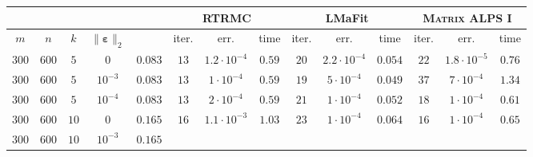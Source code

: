 \documentclass[twocolumn]{svjour3}
\newcommand{\vectornormbig}[1]{\big\|#1\big\|}
\newcommand{\noise}{\boldsymbol{\varepsilon}}
\newcommand{\rank}{k}
\begin{document}
\begin{table*}[!htp]
\begin{center}
\begin{tabular}{|c|c|c|c|c|c|c|c|c|c|c|c|c|c|}
\hline \hline \hline
\multicolumn{4}{c|}{} & & \multicolumn{3}{|c|}{RTRMC} & \multicolumn{3}{|c|}{LMaFit} & \multicolumn{3}{|c}{\textsc{Matrix ALPS I}} \\
\hline \hline
\multicolumn{1}{c}{$m$} & \multicolumn{1}{c}{$n$} & \multicolumn{1}{c}{$\rank$} & \multicolumn{1}{c|}{$\vectornormbig{\noise}_2$} & & 
\multicolumn{1}{|c}{\rm{iter.}} & \multicolumn{1}{c}{\rm{err.}} & \multicolumn{1}{c|}{\rm{time}} &
\multicolumn{1}{|c}{\rm{iter.}} & \multicolumn{1}{c}{\rm{err.}} & \multicolumn{1}{c|}{\rm{time}} &
\multicolumn{1}{|c}{\rm{iter.}} & \multicolumn{1}{c}{\rm{err.}} & \multicolumn{1}{c}{\rm{time}} \\
\hline\hline
\multicolumn{1}{c}{$300$} & \multicolumn{1}{c}{$600$} & \multicolumn{1}{c}{$5$} & \multicolumn{1}{c|}{$0$} & $0.083$ & 
\multicolumn{1}{|c}{$13$} & \multicolumn{1}{c}{$1.2\cdot 10^{-4}$} & \multicolumn{1}{c|}{$0.59$} &
\multicolumn{1}{|c}{$20$} & \multicolumn{1}{c}{$2.2\cdot 10^{-4}$} & \multicolumn{1}{c|}{$\mathbf{0.054}$} &
\multicolumn{1}{|c}{$22$} & \multicolumn{1}{c}{$1.8\cdot 10^{-5}$} & \multicolumn{1}{c}{$0.76$} \\
\hline
\multicolumn{1}{c}{$300$} & \multicolumn{1}{c}{$600$} & \multicolumn{1}{c}{$5$} & \multicolumn{1}{c|}{$10^{-3}$} & $0.083$ & 
\multicolumn{1}{|c}{$13$} & \multicolumn{1}{c}{$1\cdot 10^{-4}$} & \multicolumn{1}{c|}{$0.59$} &
\multicolumn{1}{|c}{$19$} & \multicolumn{1}{c}{$5\cdot 10^{-4}$} & \multicolumn{1}{c|}{$\mathbf{0.049}$} &
\multicolumn{1}{|c}{$37$} & \multicolumn{1}{c}{$7\cdot 10^{-4}$} & \multicolumn{1}{c}{$1.34$} \\
\hline
\multicolumn{1}{c}{$300$} & \multicolumn{1}{c}{$600$} & \multicolumn{1}{c}{$5$} & \multicolumn{1}{c|}{$10^{-4}$} & $0.083$ & 
\multicolumn{1}{|c}{$13$} & \multicolumn{1}{c}{$2\cdot 10^{-4}$} & \multicolumn{1}{c|}{$0.59$} &
\multicolumn{1}{|c}{$21$} & \multicolumn{1}{c}{$1\cdot 10^{-4}$} & \multicolumn{1}{c|}{$\mathbf{0.052}$} &
\multicolumn{1}{|c}{$18$} & \multicolumn{1}{c}{$1\cdot 10^{-4}$} & \multicolumn{1}{c}{$0.61$} \\
\hline
\multicolumn{1}{c}{$300$} & \multicolumn{1}{c}{$600$} & \multicolumn{1}{c}{$10$} & \multicolumn{1}{c|}{$0$} & $0.165$ & 
\multicolumn{1}{|c}{$16$} & \multicolumn{1}{c}{$1.1\cdot 10^{-3}$} & \multicolumn{1}{c|}{$1.03$} &
\multicolumn{1}{|c}{$23$} & \multicolumn{1}{c}{$1\cdot 10^{-4}$} & \multicolumn{1}{c|}{$\mathbf{0.064}$} &
\multicolumn{1}{|c}{$16$} & \multicolumn{1}{c}{$1\cdot 10^{-4}$} & \multicolumn{1}{c}{$0.65$} \\
\hline
\multicolumn{1}{c}{$300$} & \multicolumn{1}{c}{$600$} & \multicolumn{1}{c}{$10$} & \multicolumn{1}{c|}{$10^{-3}$} & $0.165$ & 

\end{tabular}
\end{center}
\end{table*}
\end{document}
